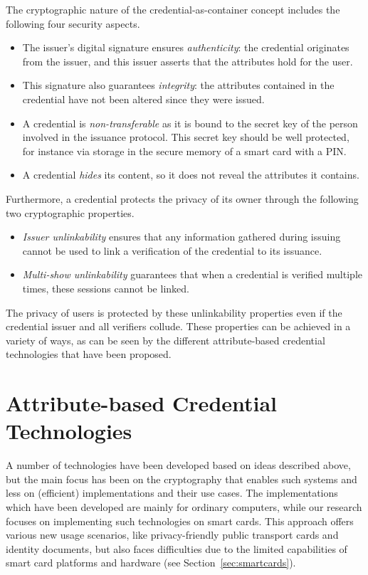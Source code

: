 The cryptographic nature of the credential-as-container concept includes the
following four security aspects.
\begin{itemize}
  \item The issuer's digital signature ensures \emph{authenticity}:
     the credential originates from the issuer, and this
    issuer asserts that the attributes hold for the user.
  \item This signature also guarantees \emph{integrity}:  the
    attributes contained in the credential have not been altered since they were
    issued.
  \item A credential is \emph{non-transferable} as
    it is bound to the secret key of the person involved in the issuance
    protocol. This secret key should be well protected, for instance via storage
    in the secure memory of a smart card with a PIN.
  \item A credential \emph{hides} its content, so it does not
    reveal the attributes it contains.
\end{itemize}
Furthermore, a credential protects the privacy of its owner
through the following two cryptographic properties.
\begin{itemize}
  \item \emph{Issuer unlinkability}
     ensures that any
    information gathered during issuing cannot be used to link a verification of
    the credential to its issuance.
  \item \emph{Multi-show unlinkability}
     guarantees
    that when a credential is verified multiple times, these sessions cannot be
    linked.
\end{itemize}
The privacy of users is protected by these unlinkability properties even if the
credential issuer and all verifiers collude. These properties can
be achieved in a variety of ways, as can be seen by the different
attribute-based credential technologies that have been proposed.

\section{Attribute-based Credential Technologies}

A number of technologies have been developed based on ideas described above, but
the main focus has been on the cryptography that enables such systems and less
on (efficient) implementations and their use cases. The implementations which
have been developed are mainly for ordinary computers, while our research
focuses on implementing such technologies on smart cards. This approach offers
various new usage scenarios, like privacy-friendly public transport cards and
identity documents, but also faces difficulties due
to the limited capabilities of smart card platforms and hardware (see
Section~\ref{sec:smartcards}).

